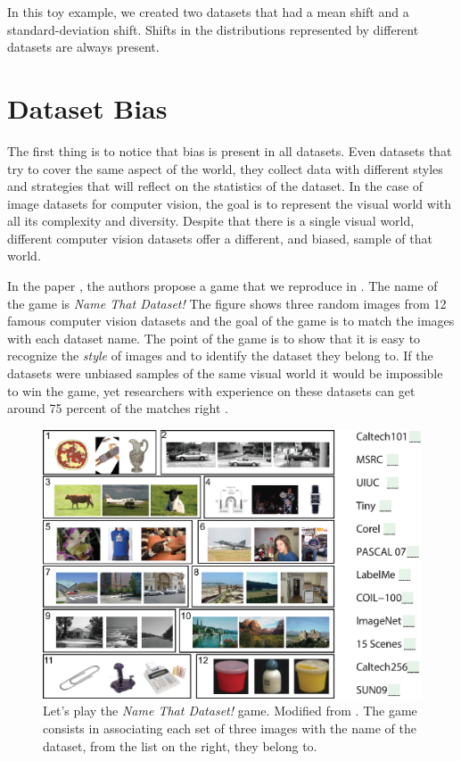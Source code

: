 In this toy example, we created two datasets that had a mean shift and a standard-deviation shift. Shifts in the distributions represented by different datasets are always present. 

\section{Dataset Bias}

The first thing is to notice that bias is present in all datasets. Even datasets that try to cover the same aspect of the world, they collect data with different styles and strategies that will reflect on the statistics of the dataset. In the case of image datasets for computer vision, the goal is to represent the visual world with all its complexity and diversity. Despite that there is a single visual world, different computer vision datasets offer a different, and biased, sample of that world.  

In the paper \cite{Torralba2011}, the authors propose a game that we reproduce in \fig{\ref{fig:bias_and_shift:datasetsJeopardy}}. The name of the game is {\em Name That Dataset!} 
The figure shows three random images from 12 famous computer vision datasets and the goal of the game is to match the images with each dataset name. The point of the game is to show that it is easy to recognize the {\em style} of images and to identify the dataset they belong to. If the datasets were unbiased samples of the same visual world it would be impossible to win the game, yet researchers with experience on these datasets can get around 75 percent of the matches right \cite{Torralba2011}.

\begin{figure}[h!]
    \centerline{
    \includegraphics[width=1\linewidth]{figures/bias_and_shift/datasetsJeopardy.eps}
    }
    \caption{Let's play the {\em Name That Dataset!} game. Modified from \cite{Torralba2011}. The game consists in associating each set of three images with the name of the dataset, from the list on the right, they belong to.}
    \label{fig:bias_and_shift:datasetsJeopardy}
\end{figure}

